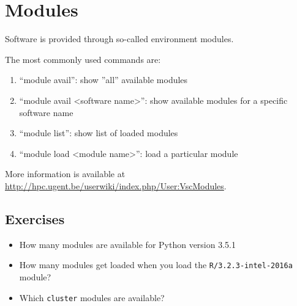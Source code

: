 \chapter{Modules}

Software is provided through so-called environment modules.

The most commonly used commands are:

\begin{enumerate}
 \item ``module avail'': show ''all'' available modules
 \item ``module avail <software name>'': show available modules for a specific software name
 \item ``module list'': show list of loaded modules
 \item ``module load <module name>'': load a particular module
\end{enumerate}

More information is available at
\url{http://hpc.ugent.be/userwiki/index.php/User:VscModules}.

\section{Exercises}

\begin{itemize}
    \item How many modules are available for Python version 3.5.1
    \item How many modules get loaded when you load the \verb|R/3.2.3-intel-2016a|
        module?
    \item Which \verb|cluster| modules are available?
\end{itemize}
